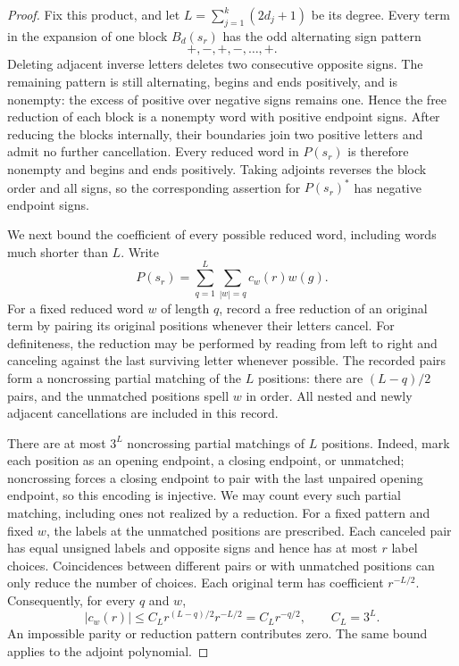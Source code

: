 \begin{proof}
Fix this product, and let $L=\sum_{j=1}^k(2d_j+1)$ be its degree.
Every term in the expansion of one block $B_d(s_r)$ has the odd
alternating sign pattern
\[
 +,-,+,-,\ldots,+.
\]
Deleting adjacent inverse letters deletes two consecutive opposite
signs.  The remaining pattern is still alternating, begins and ends
positively, and is nonempty: the excess of positive over negative
signs remains one.  Hence the free reduction of each block is a
nonempty word with positive endpoint signs.  After reducing the blocks
internally, their boundaries join two positive letters and admit no
further cancellation.  Every reduced word in $P(s_r)$ is therefore
nonempty and begins and ends positively.  Taking adjoints reverses
the block order and all signs, so the corresponding assertion for
$P(s_r)^*$ has negative endpoint signs.

We next bound the coefficient of every possible reduced word, including
words much shorter than $L$.  Write
\[
 P(s_r)=\sum_{q=1}^L\sum_{|w|=q}c_w(r)w(g).
\]
For a fixed reduced word $w$ of length $q$, record a free reduction of
an original term by pairing its original positions whenever their
letters cancel.  For definiteness, the reduction may be performed by
reading from left to right and canceling against the last surviving
letter whenever possible.  The recorded pairs form a noncrossing
partial matching of the $L$ positions: there are $(L-q)/2$ pairs, and
the unmatched positions spell $w$ in order.  All nested and newly
adjacent cancellations are included in this record.

There are at most $3^L$ noncrossing partial matchings of $L$ positions.
Indeed, mark each position as an opening endpoint, a closing endpoint,
or unmatched; noncrossing forces a closing endpoint to pair with the
last unpaired opening endpoint, so this encoding is injective.  We
may count every such partial matching, including ones not realized by
a reduction.  For a fixed pattern and fixed $w$, the labels at the
unmatched positions are prescribed.  Each canceled pair has equal
unsigned labels and opposite signs and hence has at most $r$ label
choices.  Coincidences between different pairs or with unmatched
positions can only reduce the number of choices.  Each original term
has coefficient $r^{-L/2}$.  Consequently, for every $q$ and $w$,
\begin{equation}\label{eq:rigidity-coefficient-bound}
 |c_w(r)|\leq C_L r^{(L-q)/2}r^{-L/2}
 =C_Lr^{-q/2},\qquad C_L=3^L.
\end{equation}
An impossible parity or reduction pattern contributes zero.  The same
bound applies to the adjoint polynomial.


\end{proof}
